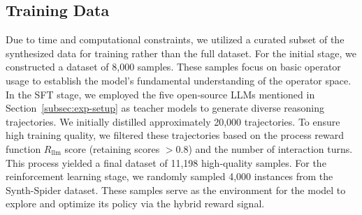 \subsection{Training Data}

Due to time and computational constraints, we utilized a curated subset of the synthesized data for training rather than the full dataset. 
For the initial stage, we constructed a dataset of 8,000 samples. These samples focus on basic operator usage to establish the model's fundamental understanding of the operator space. 
In the SFT stage, we employed the five open-source LLMs mentioned in Section~\ref{subsec:exp-setup} as teacher models to generate diverse reasoning trajectories. We initially distilled approximately 20,000 trajectories. To ensure high training quality, we filtered these trajectories based on the process reward function $R_{\text{llm}}$ score (retaining scores $> 0.8$) and the number of interaction turns. This process yielded a final dataset of 11,198 high-quality samples. 
For the reinforcement learning stage, we randomly sampled 4,000 instances from the Synth-Spider dataset. These samples serve as the environment for the model to explore and optimize its policy via the hybrid reward signal.


% 
% 
% 
% 



